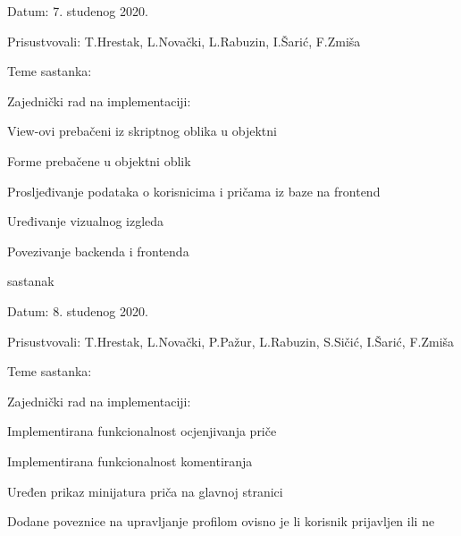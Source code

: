 \begin{packed_enum}
	\item[] \begin{packed_item}
		\item Datum: 7. studenog 2020.
		\item Prisustvovali: T.Hrestak, L.Novački, L.Rabuzin, I.Šarić, F.Zmiša
		\item Teme sastanka:
		\begin{packed_item}
			\item Zajednički rad na implementaciji:
			\begin{packed_item}
				\item  View-ovi prebačeni iz skriptnog oblika u objektni
				\item  Forme prebačene u objektni oblik
				\item  Prosljeđivanje podataka o korisnicima i pričama iz baze na frontend
				\item  Uređivanje vizualnog izgleda
				\item  Povezivanje backenda i frontenda
			\end{packed_item}
		\end{packed_item}
		
	\end{packed_item}

	\item sastanak

	\item[] \begin{packed_item}
		\item Datum: 8. studenog 2020.
		\item Prisustvovali: T.Hrestak, L.Novački, P.Pažur, L.Rabuzin, S.Sičić, I.Šarić, F.Zmiša
		\item Teme sastanka:
		\begin{packed_item}
			\item Zajednički rad na implementaciji:
			\begin{packed_item}
				\item  Implementirana funkcionalnost ocjenjivanja priče
				\item  Implementirana funkcionalnost komentiranja
				\item  Uređen prikaz minijatura priča na glavnoj stranici
				\item  Dodane poveznice na upravljanje profilom ovisno je li korisnik prijavljen ili ne
			\end{packed_item}
		\end{packed_item}
	


\end{packed_item}
\end{packed_enum}
